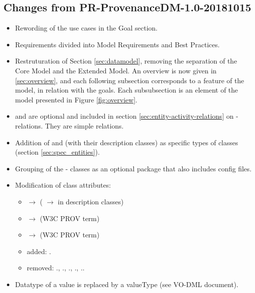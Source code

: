 
\subsection{Changes from PR-ProvenanceDM-1.0-20181015}

\begin{itemize}
\item Rewording of the use cases in the Goal section.
\item Requirements divided into Model Requirements and Best Practices.
\item Restruturation of Section \ref{sec:datamodel}, removing the separation of the Core Model and the Extended Model. An overview is now given in \ref{sec:overview}, and each following subsection corresponds to a feature of the model, in relation with the goals. Each subsubsection is an element of the model presented in Figure \ref{fig:overview}.
\item {} and  are optional and included in section \ref{sec:entity-activity-relations} on - relations. They are simple relations.
\item Addition of  and  (with their description classes) as specific types of  classes (section \ref{sec:spec_entities}).
\item Grouping of the - classes as an optional  package that also includes config files.
\item Modification of class attributes: 
\begin{itemize}
  \item {} $\rightarrow$  ( $\rightarrow$  in description classes)
  \item {} $\rightarrow$  (W3C PROV term)
  \item {} $\rightarrow$  (W3C PROV term)
  \item added: .
  \item removed: ., ., ., ., ..
\end{itemize}
\item Datatype of a value is replaced by a valueType (see VO-DML document).

\end{itemize}
